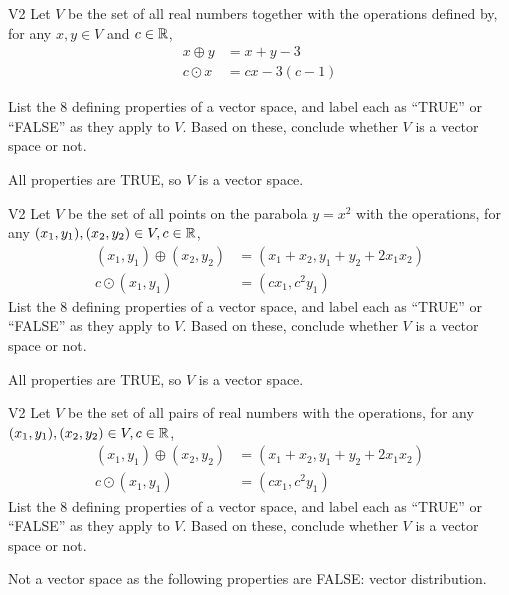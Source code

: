 \begin{problem}{V2}
Let \(V\) be the  set of all real numbers together with the operations defined by, for any \(x,y\in V\) and \(c \in \mathbb{R}\),
\begin{align*}
x\oplus y  &= x+y-3 \\
c \odot x &= cx-3(c-1)
\end{align*}

  List the 8 defining properties of a vector space, and label each as
  ``TRUE'' or ``FALSE'' as they apply to \(V\). Based on these, conclude whether
  \(V\) is a vector space or not.
\end{problem}
\begin{solution}
All properties are TRUE, so \(V\) is a vector space.
\end{solution}


\begin{problem}{V2}
Let \(V\) be the set of all points on the parabola \(y=x^2\) with the operations, for any \((x_1,y_1), (x_2,y_2) \in V,c \in \mathbb{R}\),
\begin{align*}
(x_1,y_1) \oplus (x_2,y_2) &= (x_1+x_2,y_1+y_2+2x_1x_2) \\
c \odot (x_1,y_1) &= (cx_1, c^2y_1)
\end{align*}
  List the 8 defining properties of a vector space, and label each as
  ``TRUE'' or ``FALSE'' as they apply to \(V\). Based on these, conclude whether
  \(V\) is a vector space or not.

\end{problem}
\begin{solution}
All properties are TRUE, so \(V\) is a vector space.
\end{solution}


\begin{problem}{V2}
Let \(V\) be the set of all pairs of real numbers with the operations, for any \((x_1,y_1), (x_2,y_2) \in V,c \in \mathbb{R}\),
\begin{align*}
(x_1,y_1) \oplus (x_2,y_2) &= (x_1+x_2,y_1+y_2+2x_1x_2) \\
c \odot (x_1,y_1) &= (cx_1, c^2y_1)
\end{align*}
  List the 8 defining properties of a vector space, and label each as
  ``TRUE'' or ``FALSE'' as they apply to \(V\). Based on these, conclude whether
  \(V\) is a vector space or not.

\end{problem}
\begin{solution}
Not a vector space as the following properties are FALSE:
vector distribution.
\end{solution}

